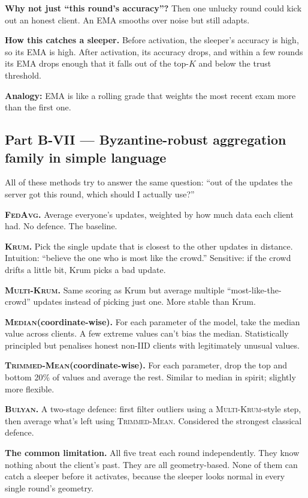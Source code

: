 \documentclass[11pt,a4paper]{article}
\newcommand{\fedavg}{\textsc{FedAvg}\xspace}
\newcommand{\krum}{\textsc{Krum}\xspace}
\newcommand{\mkrum}{\textsc{Multi-Krum}\xspace}
\newcommand{\median}{\textsc{Median}\xspace}
\newcommand{\tmean}{\textsc{Trimmed-Mean}\xspace}
\newcommand{\bulyan}{\textsc{Bulyan}\xspace}
\begin{document}
\textbf{Why not just ``this round's accuracy''?}
Then one unlucky round could kick out an honest client. An EMA smooths over
noise but still adapts.

\textbf{How this catches a sleeper.}
Before activation, the sleeper's accuracy is high, so its EMA is high. After
activation, its accuracy drops, and within a few rounds its EMA drops enough
that it falls out of the top-$K$ and below the trust threshold.

\textbf{Analogy:} EMA is like a rolling grade that weights the most recent exam
more than the first one.

\subsection{Part B-VII --- Byzantine-robust aggregation family in simple language}
\label{sec:robust-agg}

All of these methods try to answer the same question: ``out of the updates the
server got this round, which should I actually use?''

\textbf{\fedavg.}
Average everyone's updates, weighted by how much data each client had. No
defence. The baseline.

\textbf{\krum.}
Pick the single update that is closest to the other updates in distance.
Intuition: ``believe the one who is most like the crowd.'' Sensitive: if the
crowd drifts a little bit, Krum picks a bad update.

\textbf{\mkrum.}
Same scoring as Krum but average multiple ``most-like-the-crowd'' updates
instead of picking just one. More stable than Krum.

\textbf{\median (coordinate-wise).}
For each parameter of the model, take the median value across clients. A few
extreme values can't bias the median. Statistically principled but penalises
honest non-IID clients with legitimately unusual values.

\textbf{\tmean (coordinate-wise).}
For each parameter, drop the top and bottom 20\% of values and average the
rest. Similar to median in spirit; slightly more flexible.

\textbf{\bulyan.}
A two-stage defence: first filter outliers using a \mkrum-style step, then
average what's left using \tmean. Considered the strongest classical defence.

\textbf{The common limitation.}
All five treat each round independently. They know nothing about the client's
past. They are all geometry-based. None of them can catch a sleeper before it
activates, because the sleeper looks normal in every single round's geometry.
\end{document}
